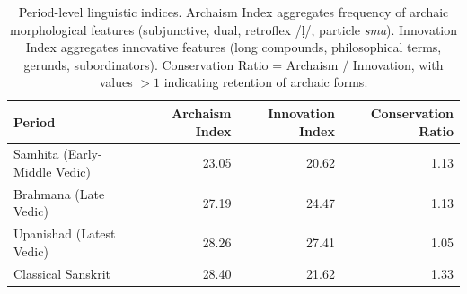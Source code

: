 \begin{table}[ht]
\centering
\caption{Period-level linguistic indices. Archaism Index aggregates frequency of archaic morphological features (subjunctive, dual, retroflex /ḷ/, particle \textit{sma}). Innovation Index aggregates innovative features (long compounds, philosophical terms, gerunds, subordinators). Conservation Ratio = Archaism / Innovation, with values $>1$ indicating retention of archaic forms.}
\label{tab:period-detection}
\begin{tabular}{lrrr}
\toprule
\textbf{Period} & \textbf{Archaism Index} & \textbf{Innovation Index} & \textbf{Conservation Ratio} \\
\midrule
Samhita (Early-Middle Vedic) & 23.05 & 20.62 & 1.13 \\
Brahmana (Late Vedic) & 27.19 & 24.47 & 1.13 \\
Upanishad (Latest Vedic) & 28.26 & 27.41 & 1.05 \\
Classical Sanskrit & 28.40 & 21.62 & 1.33 \\
\bottomrule
\end{tabular}
\end{table}